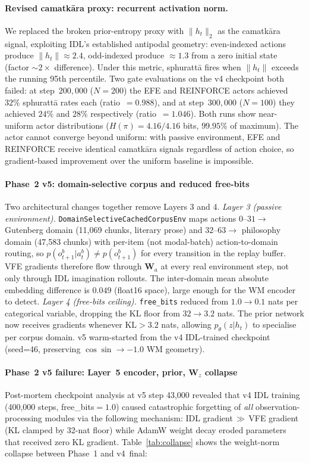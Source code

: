 \documentclass[journal,onecolumn,11pt]{IEEEtran}
\begin{document}
\paragraph{Revised camatkāra proxy: recurrent activation norm.}
We replaced the broken prior-entropy proxy with $\|h_t\|_2$ as the
camatkāra signal, exploiting IDL's established antipodal geometry:
even-indexed actions produce $\|h_t\| \approx 2.4$, odd-indexed produce $\approx 1.3$
from a zero initial state (factor ${\sim}2{\times}$ difference).
Under this metric, sphurattā fires when $\|h_t\|$ exceeds the running
95th percentile.
Two gate evaluations on the v4 checkpoint both failed: at step~$200{,}000$
($N{=}200$) the EFE and REINFORCE actors achieved $32\%$ sphurattā rates
each (ratio~$=0.988$), and at step~$300{,}000$ ($N{=}100$) they achieved
$24\%$ and $28\%$ respectively (ratio~$=1.046$).
Both runs show near-uniform actor distributions ($H(\pi) = 4.16/4.16$ bits,
$99.95\%$ of maximum).
The actor cannot converge beyond uniform: with passive environment, EFE and REINFORCE
receive identical camatkāra signals regardless of action choice, so gradient-based
improvement over the uniform baseline is impossible.

\paragraph{Phase~2 v5: domain-selective corpus and reduced free-bits}
Two architectural changes together remove Layers 3 and 4.
\emph{Layer 3 (passive environment).} \texttt{DomainSelectiveCachedCorpusEnv} maps
actions $0$--$31 \to$ Gutenberg domain (11{,}069 chunks, literary prose) and
$32$--$63 \to$ philosophy domain (47{,}583 chunks) with per-item (not modal-batch)
action-to-domain routing, so $p(o_{t+1}^b|a_t^b) \neq p(o_{t+1}^b)$ for every
transition in the replay buffer.
VFE gradients therefore flow through $\mathbf{W}_a$ at every real environment step,
not only through IDL imagination rollouts.
The inter-domain mean absolute embedding difference is $0.049$ (float16 space),
large enough for the WM encoder to detect.
\emph{Layer 4 (free-bits ceiling).} \texttt{free\_bits} reduced from $1.0 \to 0.1$
nats per categorical variable, dropping the KL floor from $32 \to 3.2$ nats.
The prior network now receives gradients whenever $\text{KL} > 3.2$ nats,
allowing $p_\theta(z|h_t)$ to specialise per corpus domain.
v5 warm-started from the v4 IDL-trained checkpoint (seed=46, preserving
$\cos\!\sin \to -1.0$ WM geometry).

\paragraph{Phase~2 v5 failure: Layer~5 encoder, prior, $\mathbf{W}_z$ collapse}
Post-mortem checkpoint analysis at v5 step 43{,}000 revealed that v4 IDL training
(400{,}000 steps, free\_bits$=1.0$) caused catastrophic forgetting of
\emph{all} observation-processing modules via the following mechanism:
IDL gradient$\,\gg\,$VFE gradient (KL clamped by 32-nat floor) while AdamW weight
decay eroded parameters that received zero KL gradient.
Table~\ref{tab:collapse} shows the weight-norm collapse between Phase~1 and v4~final:
\end{document}
